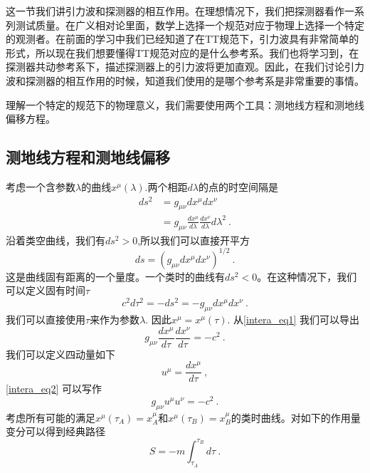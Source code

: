 这一节我们讲引力波和探测器的相互作用。在理想情况下，我们把探测器看作一系列测试质量。在广义相对论里面，数学上选择一个规范对应于物理上选择一个特定的观测者。在前面的学习中我们已经知道了在TT规范下，引力波具有非常简单的形式，所以现在我们想要懂得TT规范对应的是什么参考系。我们也将学习到，在探测器共动参考系下，描述探测器上的引力波将更加直观。因此，在我们讨论引力波和探测器的相互作用的时候，知道我们使用的是哪个参考系是非常重要的事情。

理解一个特定的规范下的物理意义，我们需要使用两个工具：测地线方程和测地线偏移方程。

\subsection{测地线方程和测地线偏移}
考虑一个含参数$\lambda$的曲线$x^\mu(\lambda)$.两个相距$d\lambda$的点的时空间隔是
\begin{equation}
\begin{aligned}
ds^2 & = g_{\mu\nu}  dx^\mu dx^\nu \\
& = g_{\mu\nu } \frac{dx^\mu}{d\lambda} \frac{dx^\nu}{d\lambda} d \lambda^2~.
\end{aligned}
\end{equation}
沿着类空曲线，我们有$ds^2>0$,所以我们可以直接开平方
\begin{equation}
ds = (g_{\mu\nu } dx^\mu dx^\nu )^{1/2}~. 
\end{equation}
这是曲线固有距离的一个量度。一个类时的曲线有$ds^2<0$。在这种情况下，我们可以定义固有时间$\tau$
\begin{equation}\label{intera_eq1}
c^2 d \tau^2  = - ds^2 = - g_{\mu\nu} dx^\mu dx^\nu ~. 
\end{equation}
我们可以直接使用$\tau$来作为参数$\lambda$. 因此$x^\mu = x^\mu(\tau)$. 从\autoref{intera_eq1} 我们可以导出
\begin{equation}\label{intera_eq2}
g_{\mu\nu} \frac{dx^\mu}{d\tau} \frac{dx^\nu}{d\tau} = - c^2~. 
\end{equation}
我们可以定义四动量如下
\begin{equation}
u^\mu = \frac{d x^\mu}{d \tau} ~,
\end{equation}
\autoref{intera_eq2} 可以写作
\begin{equation}
g_{\mu\nu} u^\mu u^\nu = - c^2~.
\end{equation}
考虑所有可能的满足$x^\mu(\tau_A)=x^\mu_{A}$和$x^\mu(\tau_B) = x^\mu_{B}$的类时曲线。对如下的作用量变分可以得到经典路径
\begin{equation}
S = - m \int_{\tau_A}^{\tau_B} d \tau~. 
\end{equation}
